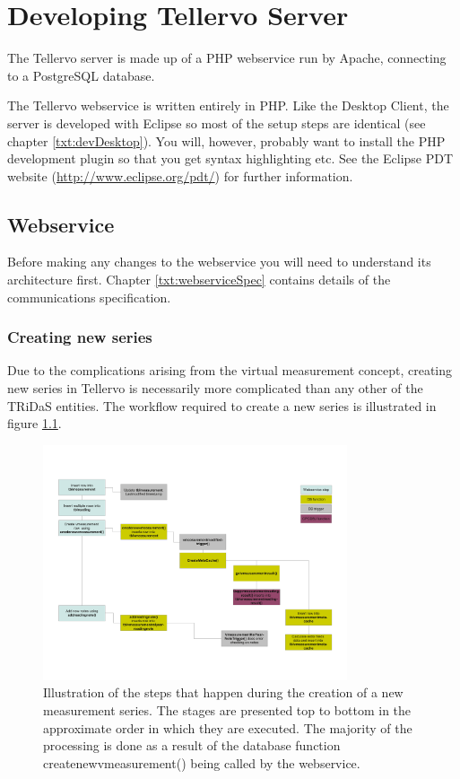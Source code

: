 \chapter{Developing Tellervo Server}

The Tellervo server is made up of a PHP webservice run by Apache, connecting to a PostgreSQL database.  

The Tellervo webservice is written entirely in PHP.  Like the Desktop Client, the server is developed with Eclipse so most of the setup steps are identical (see chapter \ref{txt:devDesktop}).  You will, however, probably want to install the PHP development plugin so that you get syntax highlighting etc.  See the Eclipse PDT website (\url{http://www.eclipse.org/pdt/}) for further information.


\section{Webservice}

Before making any changes to the webservice you will need to understand its architecture first.  Chapter \ref{txt:webserviceSpec} contains details of the communications specification.

\subsection{Creating new series}

Due to the complications arising from the virtual measurement concept, creating new series in Tellervo is necessarily more complicated than any other of the TRiDaS entities.  The workflow required to create a new series is illustrated in figure \ref{fig:creatingNewMSeries}.

\begin{figure}[hbtp]
  \centering
  \includegraphics[width=0.8\textwidth]{Images/CreatingNewMSeriesWorkflow.pdf}
  \caption{Illustration of the steps that happen during the creation of a new measurement series. The stages are presented top to bottom in the approximate order in which they are executed.  The majority of the processing is done as a result of the database function createnewvmeasurement() being called by the webservice.}
  \label{fig:creatingNewMSeries}
\end{figure}

